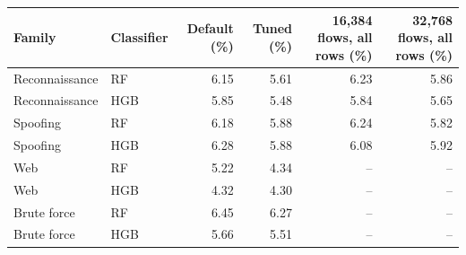 \begin{tabular}{llrrrr}
\toprule
Family & Classifier & Default (\%) & Tuned (\%) & 16,384 flows, all rows (\%) & 32,768 flows, all rows (\%) \\
\midrule
Reconnaissance & RF & 6.15 & 5.61 & 6.23 & 5.86 \\
Reconnaissance & HGB & 5.85 & 5.48 & 5.84 & 5.65 \\
Spoofing & RF & 6.18 & 5.88 & 6.24 & 5.82 \\
Spoofing & HGB & 6.28 & 5.88 & 6.08 & 5.92 \\
Web & RF & 5.22 & 4.34 & -- & -- \\
Web & HGB & 4.32 & 4.30 & -- & -- \\
Brute force & RF & 6.45 & 6.27 & -- & -- \\
Brute force & HGB & 5.66 & 5.51 & -- & -- \\
\bottomrule
\end{tabular}
